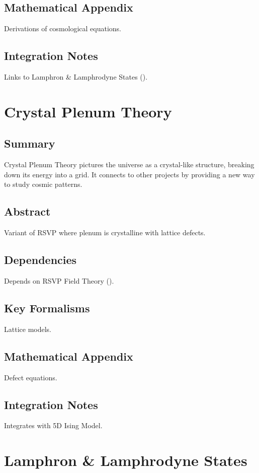 \documentclass[11pt,oneside]{memoir}
\theoremstyle{plain}
\begin{document}
\section{Mathematical Appendix}
Derivations of cosmological equations.

\section{Integration Notes}
Links to Lamphron \& Lamphrodyne States ().

\chapter{Crystal Plenum Theory}
\label{sec:crystal_plenum}
\section{Summary}
Crystal Plenum Theory pictures the universe as a crystal-like structure, breaking down its energy into a grid. It connects to other projects by providing a new way to study cosmic patterns.

\section{Abstract}
Variant of RSVP where plenum is crystalline with lattice defects.

\section{Dependencies}
Depends on RSVP Field Theory ().

\section{Key Formalisms}
Lattice models.

\section{Mathematical Appendix}
Defect equations.

\section{Integration Notes}
Integrates with 5D Ising Model.

\chapter{Lamphron \& Lamphrodyne States}
\label{sec:lamphron_lamphrodyne}
\end{document}
